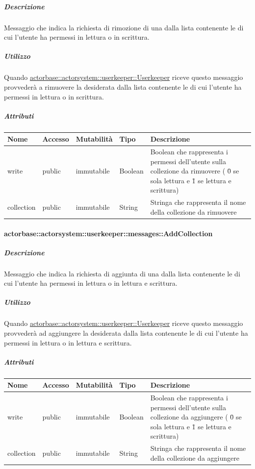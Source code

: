 \documentclass{scalatekids-article}
\begin{document}
\subparagraph{Descrizione}

Messaggio che indica la richiesta di rimozione di una  dalla
lista contenente le  di cui l'utente ha permessi in lettura
o in scrittura.

\subparagraph{Utilizzo}

Quando \hyperref[sec:actorbase::actorsystem::userkeeper::Userkeeper]{actorbase::\allowbreak{}actorsystem::\allowbreak{}userkeeper::\allowbreak{}Userkeeper}
riceve questo messaggio provvederà a rimuovere la  desiderata
dalla lista contenente le  di cui l'utente ha permessi in
lettura o in scrittura.

\subparagraph{Attributi}
\begin{tabular}{| p{3cm} | p{1.5cm} | p{2cm} | p{2cm} | p{8.5cm} |}
  \hline
  Nome & Accesso & Mutabilità & Tipo & Descrizione\\
  \hline
  write & public & immutabile & Boolean & Boolean che rappresenta i permessi dell'utente sulla collezione da rimuovere ( \=0 se sola lettura e \=1 se lettura e scrittura) \\
  \hline
  collection & public & immutabile & String & Stringa che rappresenta il nome della collezione da rimuovere \\
  \hline
\end{tabular}


\paragraph{actorbase::actorsystem::userkeeper::messages::AddCollection}
\label{sec:actorbase::actorsystem::userkeeper::messages::AddCollection}

\subparagraph{Descrizione}

Messaggio che indica la richiesta di aggiunta di una  dalla
lista contenente le  di cui l'utente ha permessi in lettura
o in lettura e scrittura.

\subparagraph{Utilizzo}

Quando \hyperref[sec:actorbase::actorsystem::userkeeper::Userkeeper]{actorbase::\allowbreak{}actorsystem::\allowbreak{}userkeeper::\allowbreak{}Userkeeper}
riceve questo messaggio provvederà ad aggiungere la  desiderata
dalla lista contenente le  di cui l'utente ha permessi in
lettura o in lettura e scrittura.

\subparagraph{Attributi}
\begin{tabular}{| p{3cm} | p{1.5cm} | p{2cm} | p{2cm} | p{8.5cm} |}
  \hline
  Nome & Accesso & Mutabilità & Tipo & Descrizione \\
  \hline
  write & public & immutabile & Boolean & Boolean che rappresenta i permessi dell'utente sulla collezione da aggiungere ( \=0 se sola lettura e \=1 se lettura e scrittura) \\
  \hline
  collection & public & immutabile & String & Stringa che rappresenta il nome della collezione da aggiungere \\
  \hline
\end{tabular}
\end{document}
